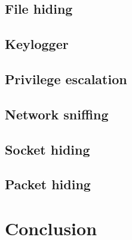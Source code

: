 \documentclass{article}
\begin{document}
\subsection{File hiding}
\subsection{Keylogger}
\subsection{Privilege escalation}
\subsection{Network sniffing}
\subsection{Socket hiding}
\subsection{Packet hiding}

\section{Conclusion}

\clearpage
\printbibliography
\end{document}
